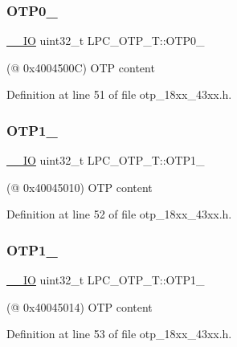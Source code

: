 \subsubsection{\texorpdfstring{O\+T\+P0\+\_}{OTP0\_3}}
{\footnotesize\ttfamily \hyperlink{core__sc300_8h_aec43007d9998a0a0e01faede4133d6be}{\+\_\+\+\_\+\+IO} uint32\+\_\+t L\+P\+C\+\_\+\+O\+T\+P\+\_\+\+T\+::\+O\+T\+P0\+\_}

(@ 0x4004500C) O\+TP content 

Definition at line 51 of file otp\+\_\+18xx\+\_\+43xx.\+h.

\mbox{\label{struct_l_p_c___o_t_p___t_aec1ad4f51673d758de8de65bddc48009}} 
\subsubsection{\texorpdfstring{O\+T\+P1\+\_}{OTP1\_0}}
{\footnotesize\ttfamily \hyperlink{core__sc300_8h_aec43007d9998a0a0e01faede4133d6be}{\+\_\+\+\_\+\+IO} uint32\+\_\+t L\+P\+C\+\_\+\+O\+T\+P\+\_\+\+T\+::\+O\+T\+P1\+\_}

(@ 0x40045010) O\+TP content 

Definition at line 52 of file otp\+\_\+18xx\+\_\+43xx.\+h.

\mbox{\label{struct_l_p_c___o_t_p___t_a46e03ed8af8d5864bcc8d2006bb85742}} 
\subsubsection{\texorpdfstring{O\+T\+P1\+\_}{OTP1\_1}}
{\footnotesize\ttfamily \hyperlink{core__sc300_8h_aec43007d9998a0a0e01faede4133d6be}{\+\_\+\+\_\+\+IO} uint32\+\_\+t L\+P\+C\+\_\+\+O\+T\+P\+\_\+\+T\+::\+O\+T\+P1\+\_}

(@ 0x40045014) O\+TP content 

Definition at line 53 of file otp\+\_\+18xx\+\_\+43xx.\+h.

\mbox{\label{struct_l_p_c___o_t_p___t_a467707a6ca10e3399a415b321deae2f1}} 
